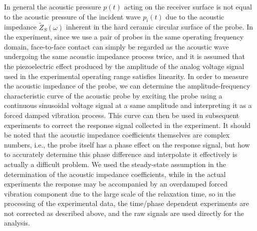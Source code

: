 \begin{digest}

    In general the acoustic pressure $p(t)$ acting on the receiver surface is not equal to the acoustic pressure of the incident wave $p_{i}(t)$ due to the acoustic impedance $\widetilde{Z}_{S}(\omega)$ inherent in the hard ceramic circular surface of the probe. 
    In the experiment, since we use a pair of probes in the same operating frequency domain, face-to-face contact can simply be regarded as the acoustic wave undergoing the same acoustic impedance process twice, and it is assumed that the piezoelectric effect produced by the amplitude of the analog voltage signal used in the experimental operating range satisfies linearity. 
    In order to measure the acoustic impedance of the probe, we can determine the amplitude-frequency characteristic curve of the acoustic probe by exciting the probe using a continuous sinusoidal voltage signal at a same amplitude and interpreting it as a forced damped vibration process. 
    This curve can then be used in subsequent experiments to correct the response signal collected in the experiment. It should be noted that the acoustic impedance coefficients themselves are complex numbers, i.e., the probe itself has a phase effect on the response signal, but how to accurately determine this phase difference and interpolate it effectively is actually a difficult problem. We used the steady-state assumption in the determination of the acoustic impedance coefficients, while in the actual experiments the response may be accompanied by an overdamped forced vibration component due to the large scale of the relaxation time, so in the processing of the experimental data, the time/phase dependent experiments are not corrected as described above, and the raw signals are used directly for the analysis.


\end{digest}
